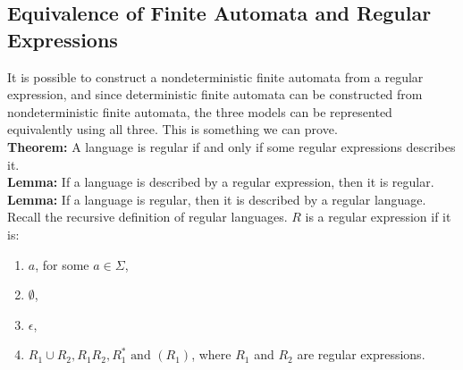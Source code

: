 \documentclass{math}
\begin{document}
\subsection*{Equivalence of Finite Automata and Regular Expressions}
It is possible to construct a nondeterministic finite automata from a regular
expression, and since deterministic finite automata can be constructed from
nondeterministic finite automata, the three models can be represented
equivalently using all three. This is something we can prove. \\
\textbf{Theorem:} A language is regular if and only if some regular expressions
describes it. \\
\textbf{Lemma:} If a language is described by a regular expression, then it is
regular. \\
\textbf{Lemma:} If a language is regular, then it is described by a regular
language. \\
Recall the recursive definition of regular languages. \( R \) is a regular
expression if it is:
\begin{enumerate}
  \item \( a \), for some \( a\in\Sigma \),
  \item \( \emptyset \),
  \item \( \epsilon \),
  \item \( R_1\cup R_2, R_1R_2, R_1^*\text{ and }(R_1) \), where \( R_1 \) and
  \( R_2 \) are regular expressions.
\end{enumerate}
\end{document}
